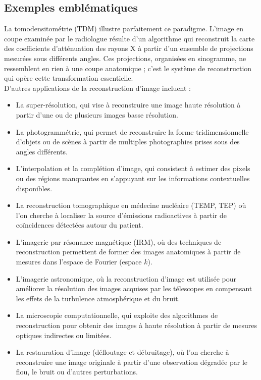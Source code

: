 \subsection{Exemples emblématiques}

La tomodensitométrie (TDM) illustre parfaitement ce paradigme. L'image en coupe examinée par le radiologue résulte d'un algorithme qui reconstruit la carte des coefficients d'atténuation des rayons X à partir d'un ensemble de projections mesurées sous différents angles. Ces projections, organisées en sinogramme, ne ressemblent en rien à une coupe anatomique ; c'est le système de reconstruction qui opère cette transformation essentielle.\\
D'autres applications de la reconstruction d'image incluent :
\begin{itemize}[label=-]
    \item La super-résolution, qui vise à reconstruire une image haute résolution à partir d'une ou de plusieurs images basse résolution.

    \item La photogrammétrie, qui permet de reconstruire la forme tridimensionnelle d'objets ou de scènes à partir de multiples photographies prises sous des angles différents.

    \item L'interpolation et la complétion d'image, qui consistent à estimer des pixels ou des régions manquantes en s'appuyant sur les informations contextuelles disponibles.

    \item La reconstruction tomographique en médecine nucléaire (TEMP, TEP) où l'on cherche à localiser la source d'émissions radioactives à partir de coïncidences détectées autour du patient.

    \item L'imagerie par résonance magnétique (IRM), où des techniques de reconstruction permettent de former des images anatomiques à partir de mesures dans l'espace de Fourier (espace $k$).

    \item L'imagerie astronomique, où la reconstruction d'image est utilisée pour améliorer la résolution des images acquises par les télescopes en compensant les effets de la turbulence atmosphérique et du bruit.

    \item La microscopie computationnelle, qui exploite des algorithmes de reconstruction pour obtenir des images à haute résolution à partir de mesures optiques indirectes ou limitées.

    \item La restauration d'image (défloutage et débruitage), où l'on cherche à reconstruire une image originale à partir d'une observation dégradée par le flou, le bruit ou d'autres perturbations.
\end{itemize}

